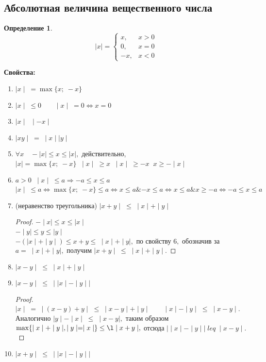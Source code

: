 \documentclass{article}
\newtheorem{Definition}{Определение}[section]
\begin{document}
\subsection{Абсолютная величина вещественного числа}
\begin{Definition}
\begin{equation*}
\mid x\mid = 
 \begin{cases}
   x, & x>0\\
   0, & x=0\\
   -x, & x<0
 \end{cases}
\end{equation*}
\end{Definition}
\par\medskip \textbf{Свойства:}\par
\begin{enumerate}
\item $\mid x\mid \;=\max\{x;\; -x\}$
\item $\mid x\mid\;\leq 0 \qquad \mid x\mid\;=0 \Leftrightarrow x=0$
\item $\mid x\mid \;\;\mid -x\mid$
\item $\mid xy\mid\; =\;\mid x\mid\mid y\mid$
\item $\forall x\quad -\mid x\mid\leq x\leq\mid x\mid,$ действительно, $\mid x\mid=\max\{x;\; -x\} \;\; \mid x\mid\;\geq x\;\;\mid x\mid\;\geq -x\;\; x\geq-\mid x\mid$
\item $a>0 \;\; \mid x\mid\;\leq a \Rightarrow -a\leq x\leq a$\\
$\mid x\mid\;\leq a \Leftrightarrow \max\{x;\; -x\}\leq a \Leftrightarrow x\leq a \mathbin{\&} -x\leq a \Leftrightarrow x\leq a\mathbin{\&} x\geq -a \Leftrightarrow -a\leq x\leq a$
\item (неравенство треугольника) $\mid x+y\mid
\;\leq\;\mid x\mid+\mid y\mid$
\begin{proof}
$-\mid x\mid\leq x\leq\mid x\mid$\\
$-\mid y\mid\leq y\leq\mid y\mid$\\
$-(\mid x\mid+\mid y\mid)\leq x+y\leq\;\mid x\mid+\mid y\mid,$ по свойству $6,$ обозначив за $a=\;\mid x\mid+\mid y\mid,$ получим $\mid x+y\mid\;\leq\;\mid x\mid+\mid y\mid.$
\end{proof}
\item $\mid x-y\mid\;\leq\;\mid x\mid+\mid y\mid$
\item $\mid x-y\mid\;\leq\;\mid\mid x\mid-\mid y\mid\mid$
\begin{proof}
$\mid x\mid\;=\;\mid(x-y)+y\mid\;\leq\;\mid x-y\mid+\mid y\mid \qquad \mid x\mid-\mid y\mid\;\leq\;\mid x-y\mid.$\\
Аналогично $\mid y\mid-\mid x\mid\;\leq\;\mid x-y\mid,$ таким образом $\max\{\mid x\mid+\mid y\mid, \mid y\mid=\mid x\mid\}\leq\l\mid x+y\mid,$ отсюда $\mid\mid x\mid -\mid y\mid\mid\;leq\;\mid x-y\mid.$
\end{proof}
\item $\mid x+y\mid\; \leq\;\mid\mid x\mid-\mid y\mid\mid$
\end{enumerate}
\end{document}
